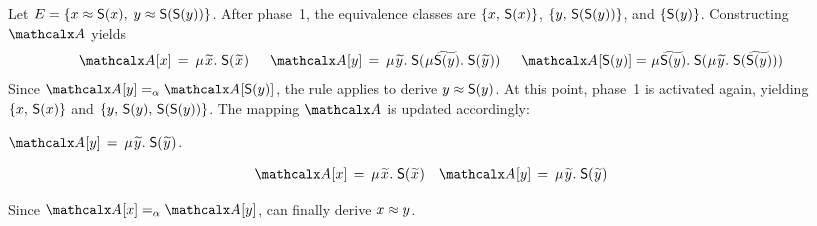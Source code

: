 
\begin{examplex}
Let $E = \{ x \approx \textsf{S}(x),\; y \approx \textsf{S}(\textsf{S}(y)) \}$.
After phase~1, the equivalence classes %
are
$\{ x,\, \textsf{S}(x) \}$,
$\{ y,\, \textsf{S}(\textsf{S}(y)) \}$,
and $\{ \textsf{S}(y) \}$.
Constructing $\Val$ yields
\begin{align*}
\Val \ec{x} & \,=\, \MU {\Varec{x}}.\; \const{S}(\Varec{x}) &
\enskip %
\Val \ec{y} & \,=\,
\MU {\Varec{y}}.\; \const{S}(\smash{\MU {\VAREC{\const{S}(y)}}}.\; \const{S}( {\Varec{y}} ) )
\enskip %
 &
\Val \ec{\const{S}(y)} & =
\MU {\VAREC{\const{S}(y)}}.\; \const{S}(\MU {\Varec{y}}.\; \const{S}( {\VAREC{\const{S}(y)}} ) )
\end{align*}
Since $\Val \ec{y} \aequiv \Val \ec{\const{S}(y)}$,
the  rule applies to derive $y \approx \textsf{S}(y)$.
%
At this point, phase~1 is activated again, %
yielding
$\{ x,\, \textsf{S}(x) \}$ and
$\{ y,\, \textsf{S}(y),\allowbreak\, \textsf{S}(\textsf{S}(y)) \}$.
The mapping $\Val$ is updated accordingly:
\begin{conf}%
$\Val \ec{y} \,=\, \MU {\Varec{y}}.\; \const{S}({\Varec{y}})$.
\end{conf}%
\begin{rep}
\begin{align*}
\Val \ec{x} & \,=\, \MU {\Varec{x}}.\; \const{S}(\Varec{x})
&
\Val \ec{y} & \,=\, \MU {\Varec{y}}.\; \const{S}({\Varec{y}})
\end{align*}
\end{rep}
Since $\Val \ec{x} \aequiv \Val \ec{y}$,
 can finally derive $x \approx y$.
\xend
\end{examplex}


